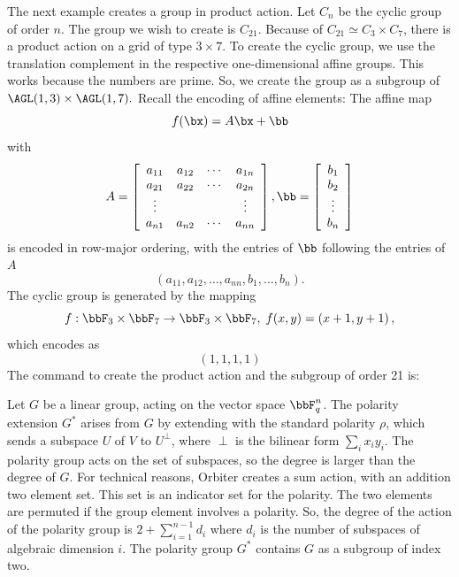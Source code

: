 The next example creates a group in product action. 
Let $C_n$ be the cyclic group of order $n$. 
The group we wish to create is $C_{21}$. 
Because of $C_{21}\simeq C_3 \times C_7$, 
there is a product action on a grid of type $3 \times 7$. 
To create the cyclic group, 
we use the translation complement in the respective one-dimensional affine groups. 
This works because the numbers are prime. 
So, we create the group as a subgroup of  $\AGL(1,3) \times \AGL(1,7).$
Recall the encoding of affine elements: 
The affine map 
$$
f(\bx) = A\bx + \bb
$$
with 
$$
A = \left[
\begin{array}{cccc}
	a_{11} & a_{12} & \cdots & a_{1n}\\
	a_{21} & a_{22} & \cdots & a_{2n}\\
	\vdots & & & \vdots \\
	a_{n1} & a_{n2} & \cdots & a_{nn}\\
\end{array}
\right], 
\bb = 
\left[
\begin{array}{c}
	b_1\\
	b_2\\
	\vdots \\
	b_n\\
\end{array}
\right]
$$
is encoded in row-major ordering, 
with the entries of $\bb$ following the entries of $A$
$$
(a_{11}, a_{12}, \ldots, a_{nn}, b_1, \ldots,b_n).
$$
The cyclic group is generated by the mapping 
$$
f: \bbF_3 \times \bbF_7  \rightarrow \bbF_3 \times \bbF_7, \; f (x,y) = \left(
x+1,y+1
\right),
$$
which encodes as 
$$
(1,1,1,1)
$$
The command to create the product action and the subgroup of order 21 is: 



\bigskip

Let $G$ be a linear group, acting on the vector space $\bbF_q^n$. 
The polarity extension $G^*$ arises from $G$ by extending with the standard polarity $\rho$, 
which sends a subspace $U$ of $V$ to $U^\perp$, 
where $\perp$ is the bilinear form $\sum_i x_iy_i$. 
The polarity group acts on the set of subspaces, 
so the degree is larger than the degree of $G$. 
For technical reasons, Orbiter creates a sum action, 
with an addition two element set. 
This set is an indicator set for the polarity. 
The two elements are permuted if the group element involves a polarity. 
So, the degree of the action of the polarity group is $2+\sum_{i=1}^{n-1} d_i$ 
where $d_i$ is the number of subspaces of algebraic dimension $i$.
The polarity group $G^*$ contains $G$ as a subgroup of index two. 


